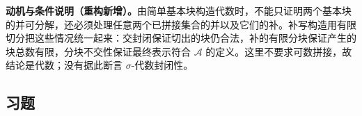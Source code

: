 \documentclass[../../main.tex]{subfiles}%
\begin{document}
\begin{remark}
\textbf{动机与条件说明（重构新增）。}由简单基本块构造代数时，不能只证明两个基本块的并可分解，还必须处理任意两个已拼接集合的并以及它们的补。补写构造用有限切分把这些情况统一起来：交封闭保证切出的块仍合法，补的有限分块保证产生的块总数有限，分块不交性保证最终表示符合 $\mathscr{A}$ 的定义。这里不要求可数拼接，故结论是代数；没有据此断言 $\sigma$-代数封闭性。
\end{remark}


\subsection*{习题}
\end{document}
